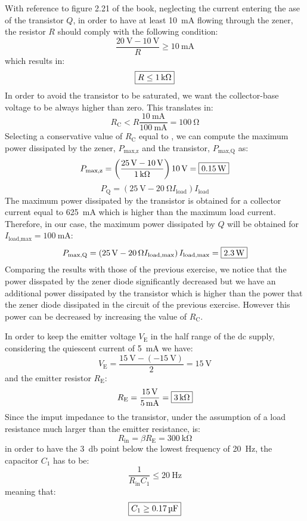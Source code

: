 With reference to figure 2.21 of the book, neglecting the current entering the ase of the transistor $Q$, in order to have at least \SI{10}{\milli\ampere} flowing through the zener, the resistor $R$ should comply with the following condition:
\[\frac{\SI{20}{\volt}-\SI{10}{\volt}}{R}\geq\SI{10}{\milli\ampere}\]
which results in:
\[\boxed{R\leq\SI{1}{\kilo\ohm}}\]
In order to avoid the transistor to be saturated, we want the collector-base voltage to be always higher than zero. This translates in:
\[R_\text{C}<R\frac{\SI{10}{\milli\ampere}}{\SI{100}{\milli\ampere}}=\SI{100}{\ohm}\]
Selecting a conservative value of $R_\text{C}$ equal to , we can compute the maximum power dissipated by the zener, $P_\text{max,z}$ and the transistor, $P_\text{max,Q}$ as:
\[P_\text{max,z}=\left(\frac{\SI{25}{\volt}-\SI{10}{\volt}}{\SI{1}{\kilo\ohm}}\right)\SI{10}{\volt}=\boxed{\SI{0.15}{\watt}}\]
\[P_\text{Q}=\left(\SI{25}{\volt}-\SI{20}{\ohm}I_\text{load}\right)I_\text{load}\]
The maximum power dissipated by the transistor is obtained for a collector current equal to \SI{625}{\milli\ampere} which is higher than the maximum load current. Therefore, in our case, the maximum power dissipated by $Q$ will be obtained for $I_\text{load,max}=\SI{100}{\milli\ampere}$:
\[P_\text{max,Q}=\left(\SI{25}{\volt}-\SI{20}{\ohm}I_\text{load,max}\right)I_\text{load,max}=\boxed{\SI{2.3}{\watt}}\]
Comparing the results with those of the previous exercise, we notice that the power disspated by the zener diode significantly decreased but we have an additional power dissipated by the transistor which is higher than the power that the zener diode dissipated in the circuit of the previous exercise. However this power can be decreased by increasing the value of $R_\text{C}$.


In order to keep the emitter voltage $V_\text{E}$ in the half range of the dc supply, considering the quiescent current of \SI{5}{\milli\ampere} we have:
\[V_\text{E}=\frac{\SI{15}{\volt}-(-\SI{15}{\volt})}{2}=\SI{15}{\volt}\]
and the emitter resistor $R_\text{E}$:
\[R_\text{E}=\frac{\SI{15}{\volt}}{\SI{5}{\milli\ampere}}=\boxed{\SI{3}{\kilo\ohm}}\]
Since the imput impedance to the transistor, under the assumption of a load resistance much larger than the emitter resistance, is:
\[R_\text{in}=\beta R_\text{E}=\SI{300}{\kilo\ohm}\]
in order to have the \SI{3}{\decibel} point below the lowest frequency of \SI{20}{\hertz}, the capacitor $C_1$ has to be:
\[\frac{1}{R_\text{in}C_1}\leq \SI{20}{\hertz}\]
meaning that:
\[\boxed{C_1\geq\SI{0.17}{\micro\farad}}\]


